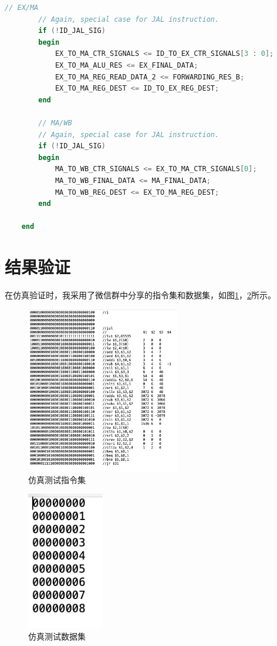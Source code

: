 \begin{lstlisting}[language=Verilog]
        // EX/MA
        // Again, special case for JAL instruction.
        if (!ID_JAL_SIG)
        begin
            EX_TO_MA_CTR_SIGNALS <= ID_TO_EX_CTR_SIGNALS[3 : 0];
            EX_TO_MA_ALU_RES <= EX_FINAL_DATA;
            EX_TO_MA_REG_READ_DATA_2 <= FORWARDING_RES_B;
            EX_TO_MA_REG_DEST <= ID_TO_EX_REG_DEST;
        end

        // MA/WB
        // Again, special case for JAL instruction.
        if (!ID_JAL_SIG)
        begin
            MA_TO_WB_CTR_SIGNALS <= EX_TO_MA_CTR_SIGNALS[0];
            MA_TO_WB_FINAL_DATA <= MA_FINAL_DATA;
            MA_TO_WB_REG_DEST <= EX_TO_MA_REG_DEST;
        end
        
    end
\end{lstlisting}

\section{结果验证}
在仿真验证时，我采用了微信群中分享的指令集和数据集，如图\ref{instruction}，\ref{initialization}所示。
\begin{figure}[!h]
    \centering
    \includegraphics[width=0.6\textwidth]{./instruction.png}
    \caption{仿真测试指令集}
    \label{instruction}
\end{figure}

\begin{figure}[!h]
    \centering
    \includegraphics[width=0.3\textwidth]{./initialization.png}
    \caption{仿真测试数据集}
    \label{initialization}
\end{figure}

